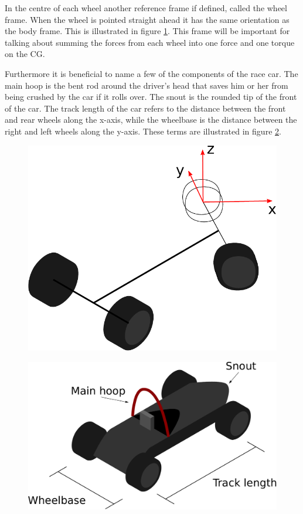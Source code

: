 In the centre of each wheel another reference frame if defined, called the wheel frame. When the wheel is pointed straight ahead it has the same orientation as the body frame. This is illustrated in figure \ref{Fig:WheelFrame}. This frame will be important for talking about summing the forces from each wheel into one force and one torque on the CG. 

Furthermore it is beneficial to name a few of the components of the race car. The main hoop is the bent rod around the driver's head that saves him or her from being crushed by the car if it rolls over. The snout is the rounded tip of the front of the car. The track length of the car refers to the distance between the front and rear wheels along the x-axis, while the wheelbase is the distance between the right and left wheels along the y-axis. These terms are illustrated in figure \ref{Fig:NameOfCarParts}.

\begin{figure}
    \centering
    \includegraphics[width=0.5\linewidth]{0_Images/2_Introduction/WheelFrame.pdf}
    \label{Fig:WheelFrame}
\end{figure}


\begin{figure}
    \centering
    \includegraphics[width=0.5\linewidth]{0_Images/2_Introduction/NameOfCarParts.pdf}
    \label{Fig:NameOfCarParts}
\end{figure}
